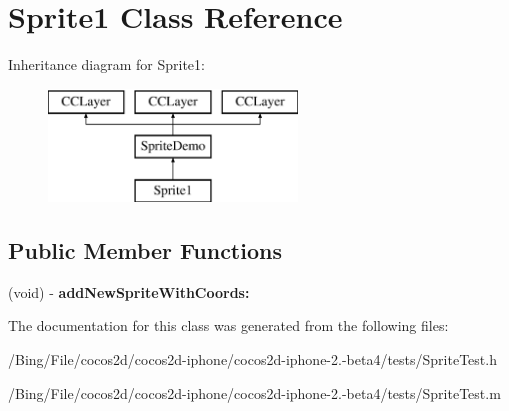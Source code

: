\hypertarget{interface_sprite1}{\section{Sprite1 Class Reference}
\label{interface_sprite1}
}
Inheritance diagram for Sprite1\-:\begin{figure}[H]
\begin{center}
\leavevmode
\includegraphics[height=3.000000cm]{interface_sprite1}
\end{center}
\end{figure}
\subsection*{Public Member Functions}
\begin{DoxyCompactItemize}
\item 
\hypertarget{interface_sprite1_ad961617741ae2b24f47d8560850a8c5a}{(void) -\/ {\bfseries add\-New\-Sprite\-With\-Coords\-:}}\label{interface_sprite1_ad961617741ae2b24f47d8560850a8c5a}

\end{DoxyCompactItemize}


The documentation for this class was generated from the following files\-:\begin{DoxyCompactItemize}
\item 
/\-Bing/\-File/cocos2d/cocos2d-\/iphone/cocos2d-\/iphone-\/2.-\/beta4/tests/Sprite\-Test.\-h\item 
/\-Bing/\-File/cocos2d/cocos2d-\/iphone/cocos2d-\/iphone-\/2.-\/beta4/tests/Sprite\-Test.\-m\end{DoxyCompactItemize}
